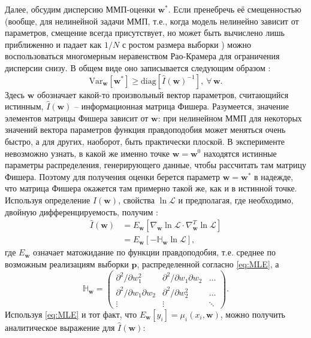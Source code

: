 \documentclass[14pt, a4paper]{extreport}
\numberwithin{equation}{section}
\begin{document}
Далее, обсудим дисперсию ММП-оценки $\mathbf{w}^*$. Если пренебречь её смещенностью (вообще, для нелинейной задачи ММП, т.е., когда модель нелинейно зависит от параметров, смещение всегда присутствует, но может быть вычислено лишь приближенно и падает как $1/N$ с ростом размера выборки \cite{cox1968}) можно воспользоваться многомерным неравенством Рао-Крамера для ограничения дисперсии снизу. В общем виде оно записывается следующим образом \cite{keener2011, schervish2012}:
\begin{equation}
\text{Var}_\mathbf{w}[\mathbf{w}^*] \geq \text{diag} [\hat I(\mathbf{w})^{-1}],\ \forall\,\mathbf{w}.
\label{eq:cramer-rao}
\end{equation} 
Здесь $\mathbf{w}$ обозначает какой-то произвольный вектор параметров, считающийся истинным, $\hat I(\mathbf{w})$ -- информационная матрица Фишера. Разумеется, значение элементов матрицы Фишера зависит от $\mathbf{w}$: при нелинейном ММП для некоторых значений вектора параметров функция правдоподобия может меняться очень быстро, а для других, наоборот, быть практически плоской. В эксперименте невозможно узнать, в какой же именно точке $\mathbf{w} =\mathbf{w}^0$ находятся истинные параметры распределения, генерирующего данные, чтобы рассчитать там матрицу Фишера. Поэтому для получения оценки берется параметр $\mathbf{w}  = \mathbf{w}^*$ в надежде, что матрица Фишера окажется там примерно такой же, как и в истинной точке. Используя определение $\hat I(\mathbf{w})$, свойства $\ln \mathcal {L}$ и предполагая, где необходимо, двойную дифференцируемость, получим \cite{keener2011, schervish2012}:
\begin{align*}
\hat I(\mathbf{w}) 
&= E_\mathbf{w} \left[ \nabla_\mathbf{w} \ln \mathcal{L} \cdot \nabla_\mathbf{w}^T \ln \mathcal{L} \right]\\
&= E_\mathbf{w} \left[ - \mathbb{H}_\mathbf{w} \ln \mathcal{L} \right],
\end{align*}
где $E_\mathbf{w}$ означает матожидание по функции правдоподобия, т.е. среднее по возможным реализациям выборки $\mathbf{p}$, распределенной согласно \eqref{eq:MLE}, а 
\[
\mathbb{H}_\mathbf{w} = 
\left(\begin{matrix}
\partial^2/\partial w_1^2 & \partial^2/\partial w_1 \partial w_2 & \dots \\
\partial^2/\partial w_1 \partial w_2
& \partial^2/\partial w_2^2 & \dots\\
\vdots & \vdots & \ddots
\end{matrix}\right).
\]
Используя \eqref{eq:MLE} и тот факт, что $E_\mathbf{w}[y_i] = \mu_i (x_i, \mathbf{w})$, можно получить аналитическое выражение для $\hat I(\mathbf w)$:
\end{document}
